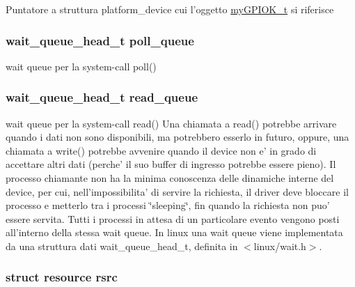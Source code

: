 Puntatore a struttura platform\+\_\+device cui l'oggetto \hyperlink{structmy_g_p_i_o_k__t}{my\+G\+P\+I\+O\+K\+\_\+t} si riferisce \hypertarget{structmy_g_p_i_o_k__t_a2080617f88cafd765430573afe7701d1}{
\subsubsection[{poll\+\_\+queue}]{\setlength{\rightskip}{0pt plus 5cm}wait\+\_\+queue\+\_\+head\+\_\+t poll\+\_\+queue}}\label{structmy_g_p_i_o_k__t_a2080617f88cafd765430573afe7701d1}
wait queue per la system-\/call poll() \hypertarget{structmy_g_p_i_o_k__t_a251570f8e6976ad87411093e330e7b4f}{
\subsubsection[{read\+\_\+queue}]{\setlength{\rightskip}{0pt plus 5cm}wait\+\_\+queue\+\_\+head\+\_\+t read\+\_\+queue}}\label{structmy_g_p_i_o_k__t_a251570f8e6976ad87411093e330e7b4f}
wait queue per la system-\/call read() Una chiamata a read() potrebbe arrivare quando i dati non sono disponibili, ma potrebbero esserlo in futuro, oppure, una chiamata a write() potrebbe avvenire quando il device non e' in grado di accettare altri dati (perche' il suo buffer di ingresso potrebbe essere pieno). Il processo chiamante non ha la minima conoscenza delle dinamiche interne del device, per cui, nell'impossibilita' di servire la richiesta, il driver deve bloccare il processo e metterlo tra i processi \char`\"{}sleeping\char`\"{}, fin quando la richiesta non puo' essere servita. Tutti i processi in attesa di un particolare evento vengono posti all'interno della stessa wait queue. In linux una wait queue viene implementata da una struttura dati wait\+\_\+queue\+\_\+head\+\_\+t, definita in $<$linux/wait.\+h$>$. \hypertarget{structmy_g_p_i_o_k__t_a565a1848c3ae8026257a74cf169c6941}{
\subsubsection[{rsrc}]{\setlength{\rightskip}{0pt plus 5cm}struct resource rsrc}}\label{structmy_g_p_i_o_k__t_a565a1848c3ae8026257a74cf169c6941}
